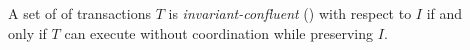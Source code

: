 \documentclass[xcolor={dvipsnames,svgnames,table}]{beamer}
\begin{document}
\begin{frame}{\iconfluence{}}
  \begin{columns}
    \begin{column}{0.5\textwidth}
    \end{column}
    \begin{column}{0.5\textwidth}  %
      \begin{center}
        A set of of transactions $T$ is \emph{invariant-confluent}
        (\iconfluent) with respect to $I$ if and only if $T$ can execute
        without coordination while preserving $I$.
      \end{center}
    \end{column}
  \end{columns}
\end{frame}
\end{document}
